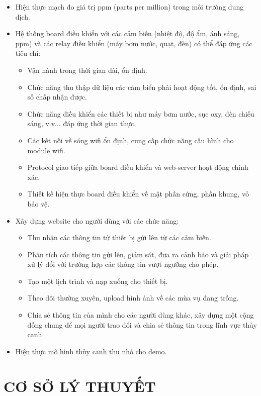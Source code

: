 \documentclass[a4paper,12pt,oneside]{article}
\begin{document}
\begin{itemize}
\item Hiện thực mạch đo giá trị ppm (parts per million) trong môi trường dung dịch.
\item Hệ thống board điều khiển với các cảm biến (nhiệt độ, độ ẩm, ánh sáng, ppm) và các relay điều khiển (máy bơm nước, quạt, đèn) có thể đáp ứng các tiêu chí:
	\begin{itemize}
		\item Vận hành trong thời gian dài, ổn định.
		\item Chức năng thu thập dữ liệu các cảm biển phải hoạt động tốt, ổn định, sai số chấp nhận được.
		\item Chức năng điều khiển các thiết bị như máy bơm nước, sục oxy, đèn chiếu sáng, v.v... đáp ứng thời gian thực.
		\item Các kết nối về sóng wifi ổn định, cung cấp chức năng cấu hình cho module wifi.
		\item Protocol giao tiếp giữa board điều khiển và web-server hoạt động chính xác.
		\item Thiết kế hiện thực board điều khiển về mặt phần cứng, phần khung, vỏ bảo vệ.
	\end{itemize} 
\item Xây dựng website cho người dùng với các chức năng:
	\begin{itemize}
		\item Thu nhận các thông tin từ thiết bị  gửi lên từ các cảm biến.
		\item Phân tích các thông tin gửi lên, giám sát, đưa ra cảnh báo và giải pháp xử lý đối với trường hợp các thông tin vượt ngưỡng cho phép.
		\item Tạo một lịch trình và nạp xuống cho thiết bị.
		\item Theo dõi thường xuyên, upload hình ảnh về các mùa vụ đang trồng.
		\item Chia sẻ thông tin của mình cho các người dùng khác, xây dựng một cộng đồng chung để mọi người trao đổi và chia sẻ thông tin trong lĩnh vực thủy canh.
	\end{itemize}
\item Hiện thực mô hình thủy canh thu nhỏ cho demo.
\end{itemize}


\newpage

\section{CƠ SỞ LÝ THUYẾT}
\end{document}
